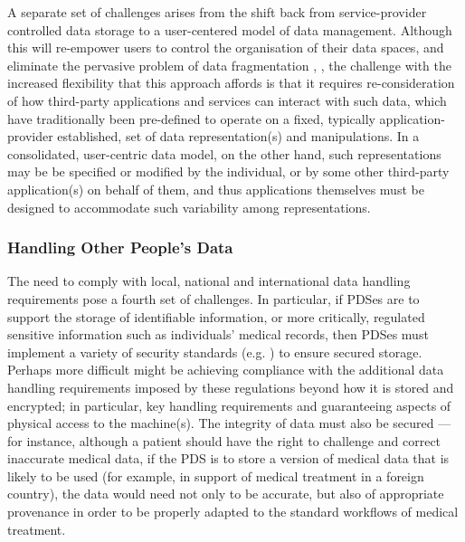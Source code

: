 \documentclass{acm_proc_article-sp}
\begin{document}
A separate set of challenges arises from the shift back from service-provider controlled data storage to a user-centered model of data management. Although this will re-empower users to control the organisation of their data spaces, and eliminate the pervasive problem of data fragmentation \cite{karger2006data}, \cite{heath2011linked}, the challenge with the increased flexibility that this approach affords is that it requires re-consideration of how third-party applications and services can interact with such data, which have traditionally been pre-defined to operate on a fixed, typically application-provider established, set of data representation(s) and manipulations.  In a consolidated, user-centric data model, on the other hand, such representations may be be specified or modified by the individual, or by some other third-party application(s) on behalf of them, and thus applications themselves must be designed to accommodate such variability among representations.

\subsubsection{Handling Other People's Data}

The need to comply with local, national and international data handling requirements pose a fourth set of challenges. In particular, if  PDSes are to support the storage of identifiable information, or more critically, regulated sensitive information such as individuals' medical records, then PDSes must implement a variety of security standards (e.g. \cite{mccallister2010guide}) to ensure secured storage.  Perhaps more difficult might be achieving compliance with the additional data handling requirements imposed by these regulations beyond how it is stored and encrypted; in particular, key handling requirements and guaranteeing aspects of physical access to the machine(s). The integrity of data must also be secured --- for instance, although a patient should have the right to challenge and correct inaccurate medical data, if the PDS is to store a version of medical data that is likely to be used (for example, in support of medical treatment in a foreign country), the data would need not only to be accurate, but also of appropriate provenance in order to be properly adapted to the standard workflows of medical treatment.
\end{document}
